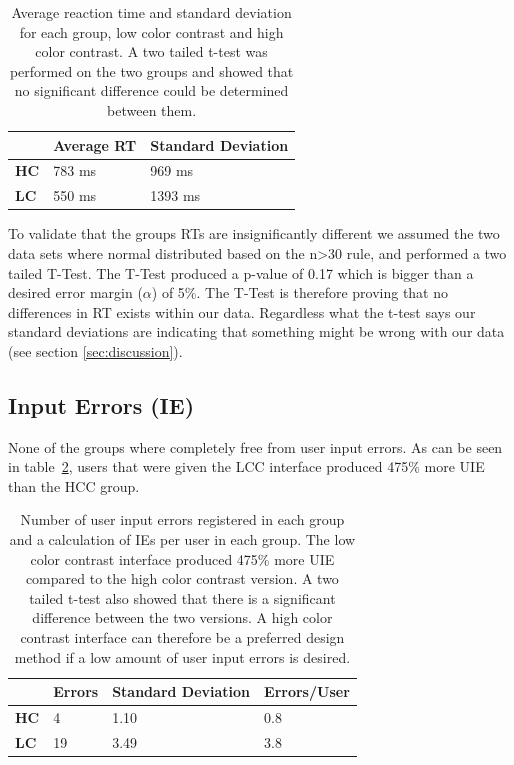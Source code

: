 \documentclass[runningheads,a4paper]{llncs}
\begin{document}
\begin{table}[]
	\centering
	\setlength{\tabcolsep}{1em}
	\setlength\extrarowheight{1em}
	\begin{tabular}{l|l|l}
		\textbf{} & \textbf{Average RT} & \textbf{Standard Deviation} \\ \hline
		\textbf{HC} & 783 ms & 969 ms \\ \hline
		\textbf{LC} & 550 ms & 1393 ms
	\end{tabular}
	\caption{Average reaction time and standard deviation for each group, low color contrast and high color contrast. A two tailed t-test was performed on the two groups and showed that no significant difference could be determined between them.
	\label{tab:groupRT}}
\end{table}

To validate that the groups RTs are insignificantly different we assumed the two data sets where normal distributed based on the n>30 rule, and performed a two tailed T-Test. The T-Test produced a p-value of 0.17 which is bigger than a desired error margin ($\alpha$) of 5\%. The T-Test is therefore proving that no differences in RT exists within our data. Regardless what the t-test says our standard deviations are indicating that something might be wrong with our data (see section \ref{sec:discussion}).

\subsection{Input Errors (IE)}
None of the groups where completely free from user input errors. As can be seen in table~\ref{tab:userIE}, users that were given the LCC interface produced 475\% more UIE than the HCC group.

\begin{table}[]
	\centering
	\setlength{\tabcolsep}{1em}
	\setlength\extrarowheight{1em}
	\begin{tabular}{l|l|l|l}
		\textbf{} & \textbf{Errors} & \textbf{Standard Deviation} & \textbf{Errors/User} \\ \hline
		\textbf{HC} & 4 & 1.10 & 0.8 \\ \hline
		\textbf{LC} & 19 & 3.49 & 3.8
	\end{tabular}
	\caption{Number of user input errors registered in each group and a calculation of IEs per user in each group. The low color contrast interface produced 475\% more UIE compared to the high color contrast version. A two tailed t-test also showed that there is a significant difference between the two versions. A high color contrast interface can therefore be a preferred design method if a low amount of user input errors is desired.
	\label{tab:userIE}}
\end{table}
\end{document}
